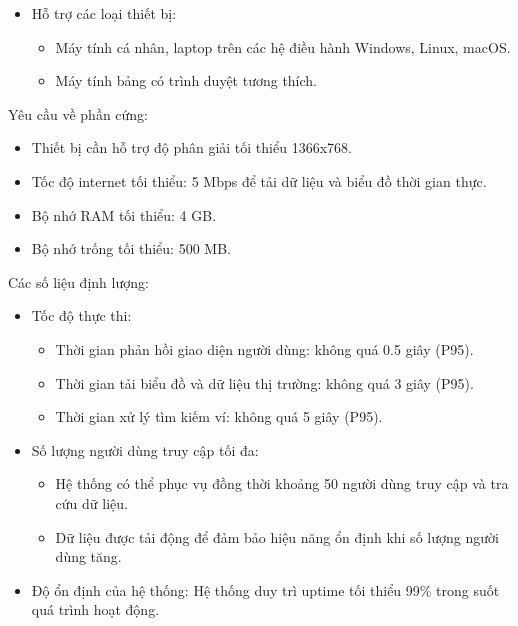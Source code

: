\documentclass{article}[14pt]
\begin{document}
{\begin{itemize}
        \item Hỗ trợ các loại thiết bị:
        \begin{itemize}
            \item Máy tính cá nhân, laptop trên các hệ điều hành Windows, Linux, macOS.
            \item Máy tính bảng có trình duyệt tương thích.
        \end{itemize}
    \end{itemize}
    
    \hspace{-0.5cm}Yêu cầu về phần cứng:
    
    \begin{itemize}
        \item Thiết bị cần hỗ trợ độ phân giải tối thiểu 1366x768.
        \item Tốc độ internet tối thiểu: 5 Mbps để tải dữ liệu và biểu đồ thời gian thực.
        \item Bộ nhớ RAM tối thiểu: 4 GB.
        \item Bộ nhớ trống tối thiểu: 500 MB.
    \end{itemize}
    
    \hspace{-0.7cm} Các số liệu định lượng:
    
    \begin{itemize}
        \item Tốc độ thực thi:
        \begin{itemize}
            \item Thời gian phản hồi giao diện người dùng: không quá 0.5 giây (P95).
            \item Thời gian tải biểu đồ và dữ liệu thị trường: không quá 3 giây (P95).
            \item Thời gian xử lý tìm kiếm ví: không quá 5 giây (P95).
        \end{itemize}
    
        \item Số lượng người dùng truy cập tối đa:
        \begin{itemize}
            \item Hệ thống có thể phục vụ đồng thời khoảng 50 người dùng truy cập và tra cứu dữ liệu.
            \item Dữ liệu được tải động để đảm bảo hiệu năng ổn định khi số lượng người dùng tăng.
        \end{itemize}
    
        \item Độ ổn định của hệ thống: Hệ thống duy trì uptime tối thiểu 99\% trong suốt quá trình hoạt động.


\end{itemize}}
\end{document}
